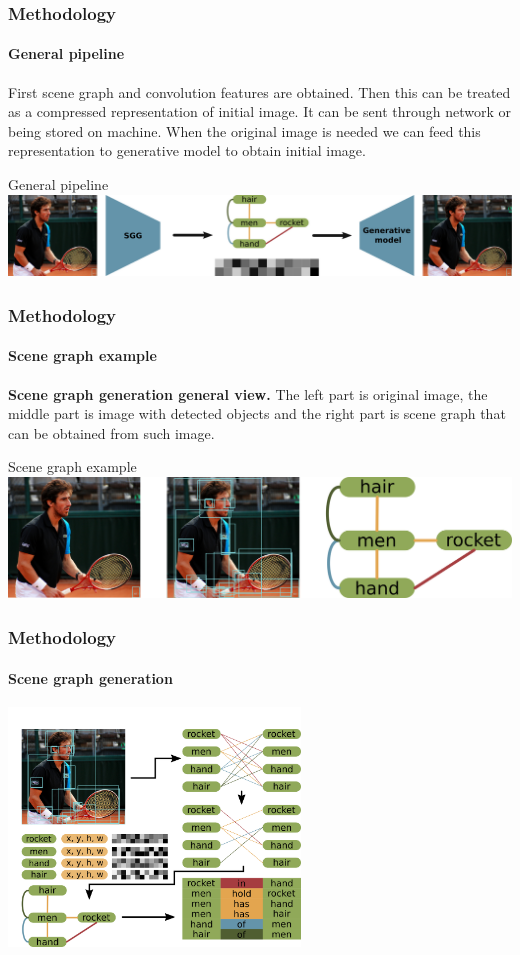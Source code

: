 \documentclass[10pt]{beamer}
\begin{document}
\begin{frame}
    \frametitle{Methodology}
    \framesubtitle{General pipeline}
    First scene graph and convolution features are obtained. Then this can be treated as a compressed representation of initial image. It can be sent through network or being stored on machine. When the original image is needed we can feed this representation to generative model to obtain initial image.
    \begin{block}{General pipeline}
        \includegraphics[width=\textwidth]{figure/application-general-pipeline.png}
    \end{block}
\end{frame}

\begin{frame}
    \frametitle{Methodology}
    \framesubtitle{Scene graph example}
    \textbf{Scene graph generation general view.} The left part is original image, the middle part is image with detected objects and the right part is scene graph that can be obtained from such image.
    \begin{block}{Scene graph example}
        \includegraphics[width=\textwidth]{figure/scene-graph-example.png}
    \end{block}
\end{frame}

\begin{frame}
    \frametitle{Methodology}
    \framesubtitle{Scene graph generation}
    \centering
    \includegraphics[height=180pt]{figure/sgg-pipeline.png}
\end{frame}
\end{document}
